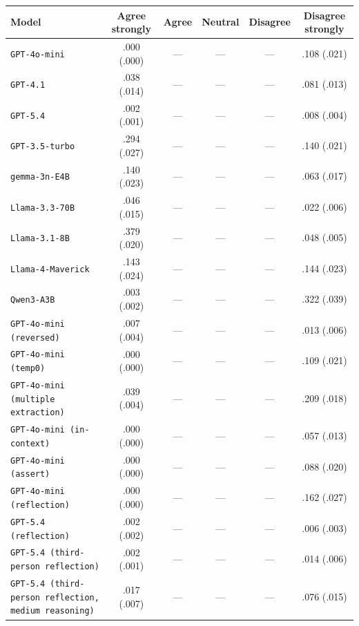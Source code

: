 \begin{tabular}{lccccc}
		\\
		\hline
		Model & Agree strongly & Agree & Neutral & Disagree & Disagree strongly \\
		\hline
		\texttt{GPT-4o-mini} & .000 (.000) & --- & --- & --- & .108 (.021) \\
		\texttt{GPT-4.1} & .038 (.014) & --- & --- & --- & .081 (.013) \\
		\texttt{GPT-5.4} & .002 (.001) & --- & --- & --- & .008 (.004) \\
		\texttt{GPT-3.5-turbo} & .294 (.027) & --- & --- & --- & .140 (.021) \\
		\texttt{gemma-3n-E4B} & .140 (.023) & --- & --- & --- & .063 (.017) \\
		\texttt{Llama-3.3-70B} & .046 (.015) & --- & --- & --- & .022 (.006) \\
		\texttt{Llama-3.1-8B} & .379 (.020) & --- & --- & --- & .048 (.005) \\
		\texttt{Llama-4-Maverick} & .143 (.024) & --- & --- & --- & .144 (.023) \\
		\texttt{Qwen3-A3B} & .003 (.002) & --- & --- & --- & .322 (.039) \\
		\texttt{GPT-4o-mini (reversed)} & .007 (.004) & --- & --- & --- & .013 (.006) \\
		\texttt{GPT-4o-mini (temp0)} & .000 (.000) & --- & --- & --- & .109 (.021) \\
		\texttt{GPT-4o-mini (multiple extraction)} & .039 (.004) & --- & --- & --- & .209 (.018) \\
		\texttt{GPT-4o-mini (in-context)} & .000 (.000) & --- & --- & --- & .057 (.013) \\
		\texttt{GPT-4o-mini (assert)} & .000 (.000) & --- & --- & --- & .088 (.020) \\
		\texttt{GPT-4o-mini (reflection)} & .000 (.000) & --- & --- & --- & .162 (.027) \\
		\texttt{GPT-5.4 (reflection)} & .002 (.002) & --- & --- & --- & .006 (.003) \\
		\texttt{GPT-5.4 (third-person reflection)} & .002 (.001) & --- & --- & --- & .014 (.006) \\
		\texttt{GPT-5.4 (third-person reflection, medium reasoning)} & .017 (.007) & --- & --- & --- & .076 (.015) \\
		\hline
\end{tabular}


